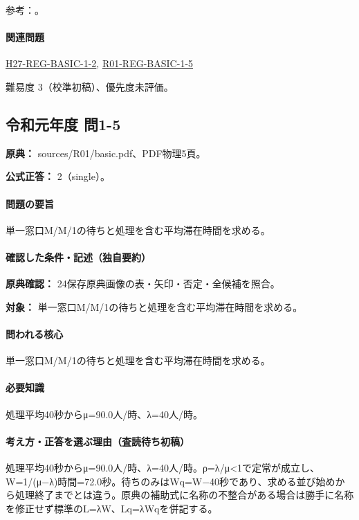 \par 参考：\cite{design48_queue_ref}。

\paragraph{関連問題} \hyperref[q:h27-reg-basic-1-2]{H27-REG-BASIC-1-2}, \hyperref[q:r01-reg-basic-1-5]{R01-REG-BASIC-1-5}

\par 難易度 3（校準初稿）、優先度未評価。

\subsection{令和元年度 問1-5}
\label{q:r01-reg-basic-1-5}

\noindent\textbf{原典：} sources/R01/basic.pdf、PDF物理5頁。

\textbf{公式正答：} 2（single）。

\paragraph{問題の要旨} 単一窓口M/M/1の待ちと処理を含む平均滞在時間を求める。

\paragraph{確認した条件・記述（独自要約）}\mbox{}\par

\noindent\textbf{原典確認：} 24保存原典画像の表・矢印・否定・全候補を照合。\par

\noindent\textbf{対象：} 単一窓口M/M/1の待ちと処理を含む平均滞在時間を求める。\par

\paragraph{問われる核心} 単一窓口M/M/1の待ちと処理を含む平均滞在時間を求める。

\paragraph{必要知識} 処理平均40秒からμ=90.0人/時、λ=40人/時。

\paragraph{考え方・正答を選ぶ理由（査読待ち初稿）} 処理平均40秒からμ=90.0人/時、λ=40人/時。ρ=λ/μ<1で定常が成立し、W=\allowbreak{}1/(μ−λ)時間=72.0秒。待ちのみはWq=\allowbreak{}W−40秒であり、求める並び始めから処理終了までとは違う。原典の補助式に名称の不整合がある場合は勝手に名称を修正せず標準のL=λW、Lq=λWqを併記する。

